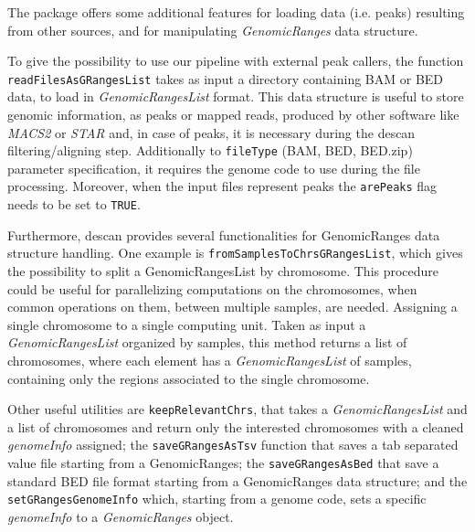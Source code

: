 The package offers some additional features for loading data (i.e. peaks) resulting from other sources, and for manipulating \textit{GenomicRanges} data structure.

To give the possibility to use our pipeline with external peak callers, the function \lstinline!readFilesAsGRangesList! takes as input a directory containing BAM or BED data, to load in \textit{GenomicRangesList} format.
This data structure is useful to store genomic information, as peaks or mapped reads, produced by other software like \textit{MACS2} or \textit{STAR} and, in case of peaks, it is necessary during the \gls{descan} filtering/aligning step.
Additionally to \lstinline!fileType! (BAM, BED, BED.zip) parameter specification, it requires the genome code to use during the file processing.
Moreover, when the input files represent peaks the \lstinline!arePeaks! flag needs to be set to \lstinline!TRUE!.

Furthermore, \gls{descan} provides several functionalities for GenomicRanges data structure
handling. One example is \lstinline!fromSamplesToChrsGRangesList!, which gives the possibility to split a GenomicRangesList by chromosome. 
This procedure could be useful for parallelizing computations on the chromosomes, when common operations on them, between multiple samples, are needed. Assigning a single chromosome to a single computing unit.
Taken as input a \textit{GenomicRangesList} organized by samples, this method returns a list of chromosomes, where each element has a \textit{GenomicRangesList} of samples, containing only the regions associated to the single chromosome.


Other useful utilities are \lstinline!keepRelevantChrs!, that takes a \textit{GenomicRangesList} and a list of chromosomes and return only the interested chromosomes with a cleaned \textit{genomeInfo} assigned;
the \lstinline!saveGRangesAsTsv! function that saves a tab separated value file starting from a GenomicRanges; the 
\lstinline!saveGRangesAsBed! that save a standard BED file format starting from a GenomicRanges data structure; and the \lstinline!setGRangesGenomeInfo! which, starting from a genome code, sets a specific \textit{genomeInfo} to a \textit{GenomicRanges} object.